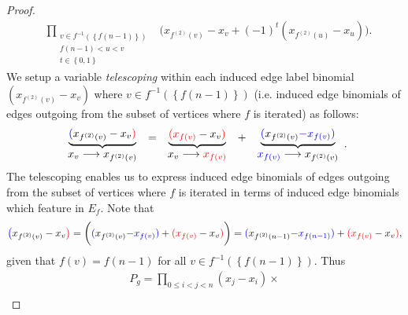 \begin{proof}
\begin{equation}
\begin{array}{ccc}
 & \underset{\begin{array}{c}
v\in f^{-1}\left(\left\{ f\left(n-1\right)\right\} \right)\\
f\left(n-1\right)<u<v\\
t\in\left\{ 0,1\right\} 
\end{array}}{\prod} & \bigg(x_{f^{\left(2\right)}\left(v\right)}-x_{v}+\left(-1\right)^{t}(x_{f^{\left(2\right)}\left(u\right)}-x_{u})\bigg).
\end{array}
\end{equation}
We setup a variable \emph{telescoping} within each induced edge label binomial $(x_{f^{\left(2\right)}\left(v\right)}-x_{v})$
where $v\in f^{-1}\left(\left\{ f\left(n-1\right)\right\} \right)$
(i.e. induced edge binomials of edges outgoing from the subset of vertices where $f$ is iterated) as follows:
\[
\begin{array}{c}
\underbrace{{\color{blue}(}x_{f^{(2)}(v)}-x_{v}{\color{red})}}\\
x_{v}\longrightarrow x_{f^{(2)}(v)}
\end{array}\begin{array}{c}
=\\
\\
\end{array}\begin{array}{c}
\underbrace{{\color{red}(x_{f(v)}}-x_{v}{\color{red})}}\\
x_{v}\longrightarrow{\color{red}x_{f(v)}}
\end{array}\begin{array}{c}
+\\
\\
\end{array}\begin{array}{c}
\underbrace{{\color{blue}(}x_{f^{(2)}(v)}{\color{blue}-x_{f(v)}}{\color{blue})}}\\
{\color{blue}x_{f(v)}}\longrightarrow x_{f^{(2)}(v)}
\end{array}.
\]
The telescoping enables us to express induced edge binomials of edges outgoing from the subset of vertices where $f$ is iterated in terms of induced edge binomials which feature in $E_f$. Note that
\[
{\color{blue}\big(}x_{f^{\left(2\right)}(v)}-x_{v}{\color{red}\big)}=\bigg({\color{blue}(}x_{f^{\left(2\right)}(v)}{\color{blue}-x_{f(v)}}{\color{blue})}+{\color{red}(x_{f(v)}}-x_{v}{\color{red})}\bigg)={\color{blue}(}x_{f^{(2)}(n-1)}{\color{blue}-x_{f(n-1)}}{\color{blue})}+{\color{red}(x_{f(v)}}-x_{v}{\color{red})},
\]
given that $f\left(v\right)=f\left(n-1\right)$
for all $v\in f^{-1}\left(\left\{ f(n-1)\right\} \right)$. Thus
\[
\begin{array}{c}
P_{g} = \underset{0 \le i < j < n}{\prod} \left(x_{j} - x_{i}\right) \times \\[10pt]


\end{array}\]
\end{proof}
